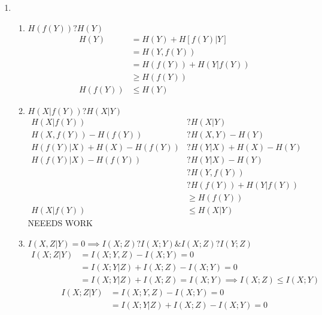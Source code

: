\documentclass[pdftex,12pt,a4paper]{article}
\begin{document}


\begin{enumerate}
    \item
        \begin{enumerate}
            \item $H(f(Y)) ? H(Y)$\\
                \begin{align}
                    H(Y) &= H(Y) + H[f(Y)|Y]\\
                         &= H(Y,f(Y))\\
                         &= H(f(Y)) + H(Y|f(Y))\\
                         &\ge H(f(Y))\\
                 H(f(Y)) &\le H(Y)
                \end{align}
            \item $H(X|f(Y)) ? H(X|Y)$
                \begin{align}
                    H(X|f(Y)) &? H(X|Y)\\
                    H(X,f(Y)) - H(f(Y)) &? H(X,Y) - H(Y)\\
                    H(f(Y)|X) + H(X) - H(f(Y)) &? H(Y|X) + H(X) - H(Y)\\
                    H(f(Y)|X) - H(f(Y)) &? H(Y|X) - H(Y)\\
                              &? H(Y,f(Y))\\
                              &? H(f(Y)) + H(Y|f(Y))\\
                              &\ge H(f(Y))\\
                 H(X|f(Y)) &\le H(X|Y)
                \end{align}
                NEEEDS WORK
            \item $I(X,Z|Y) = 0 \implies I(X;Z) ? I(X;Y)\mathrm{ \& }I(X;Z) ? I(Y;Z)$
                \begin{align}
                    I(X;Z|Y) &= I(X;Y,Z) - I(X;Y) = 0\\
                             &= I(X;Y|Z) + I(X;Z) - I(X;Y) = 0\\
                             &= I(X;Y|Z) + I(X;Z) = I(X;Y) \implies I(X;Z) \le I(X;Y)
                \end{align}
                \begin{align}
                    I(X;Z|Y) &= I(X;Y,Z) - I(X;Y) = 0\\
                             &= I(X;Y|Z) + I(X;Z) - I(X;Y) = 0\\

\end{align}
\end{enumerate}
\end{enumerate}
\end{document}

